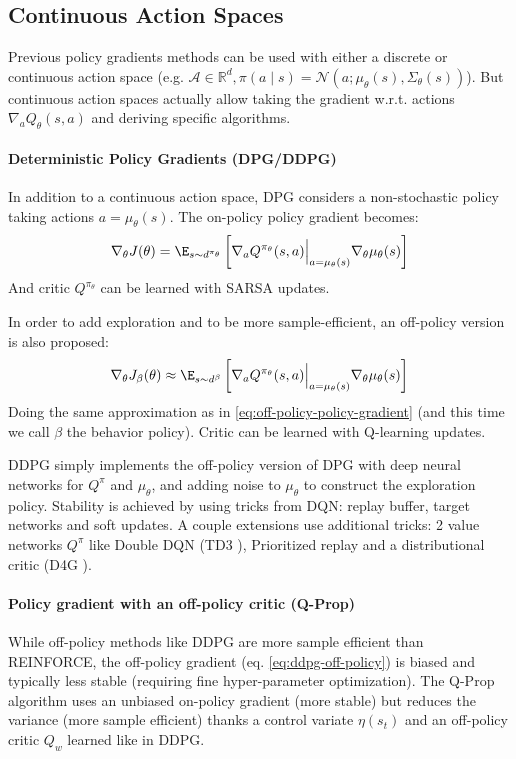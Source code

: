 \subsection{Continuous Action Spaces}
Previous policy gradients methods can be used with either a discrete or continuous action space (e.g. $\mathcal{A} \in \mathbb{R}^d, \pi(a\mid s) = \mathcal{N}(a; \mu_\theta(s), \Sigma_\theta(s))$). But continuous action spaces actually allow taking the gradient w.r.t. actions $\nabla_a Q_\theta(s,a)$ and deriving specific algorithms.

\paragraph{Deterministic Policy Gradients (DPG/DDPG)} \cite{silver2014deterministic} \cite{lillicrap2015continuous}
In addition to a continuous action space, DPG considers a non-stochastic policy taking actions $a = \mu_\theta(s)$. The on-policy policy gradient becomes:
\begin{equation}
    \nabla_\theta J(\theta) = \E_{s\sim d^{\pi_\theta}} \left[
        \nabla_a Q^{\pi_\theta}(s,a) \Bigr|_{a=\mu_\theta(s)} \nabla_\theta \mu_\theta(s)
    \right]
\label{eq:ddpg-on-policy}
\end{equation}
And critic $Q^{\pi_\theta}$ can be learned with SARSA updates.

In order to add exploration and to be more sample-efficient, an off-policy version is also proposed:
\begin{equation}
    \nabla_\theta J_\beta(\theta) \approx \E_{s\sim d^\beta} \left[
        \nabla_a Q^{\pi_\theta}(s,a) \Bigr|_{a=\mu_\theta(s)} \nabla_\theta \mu_\theta(s)
    \right]
\label{eq:ddpg-off-policy}
\end{equation}
Doing the same approximation as in \ref{eq:off-policy-policy-gradient} (and this time we call $\beta$ the behavior policy). Critic can be learned with Q-learning updates.

DDPG simply implements the off-policy version of DPG with deep neural networks for $Q^\pi$ and $\mu_\theta$, and adding noise to $\mu_\theta$ to construct the exploration policy. Stability is achieved by using tricks from DQN: replay buffer, target networks and soft updates. A couple extensions use additional tricks: 2 value networks $Q^\pi$ like Double DQN (TD3 \cite{fujimoto2018addressing}), Prioritized replay and a distributional critic (D4G \cite{barth2018distributed}).


\paragraph{Policy gradient with an off-policy critic (Q-Prop)} \cite{gu2016q}
While off-policy methods like DDPG are more sample efficient than REINFORCE, the off-policy gradient (eq. \ref{eq:ddpg-off-policy}) is biased and typically less stable (requiring fine hyper-parameter optimization). The Q-Prop algorithm uses an unbiased on-policy gradient (more stable) but reduces the variance (more sample efficient) thanks a control variate $\eta(s_t)$ and an off-policy critic $Q_w$ learned like in DDPG.

